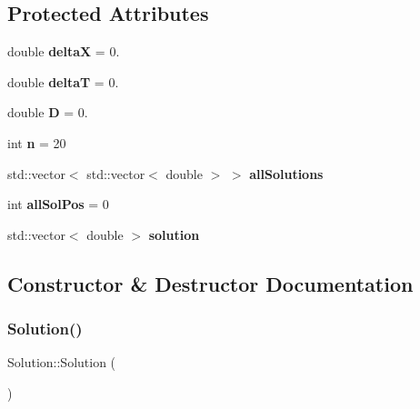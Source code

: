 \subsection*{Protected Attributes}
\begin{DoxyCompactItemize}
\item 
\mbox{\label{class_solution_a8e97e5534ddcde31983432b8fb2050ff}} 
double {\bfseries deltaX} = 0.
\item 
\mbox{\label{class_solution_a116a08a1a8793618fb5269016cfd9b61}} 
double {\bfseries deltaT} = 0.
\item 
\mbox{\label{class_solution_af647b9b893549259060034672babb0f8}} 
double {\bfseries D} = 0.
\item 
\mbox{\label{class_solution_aca95282163f453b465bb1991c596a34e}} 
int {\bfseries n} = 20
\item 
\mbox{\label{class_solution_a09fa8d2538a87e8d9cba2ee682f729ac}} 
std\+::vector$<$ std\+::vector$<$ double $>$ $>$ {\bfseries all\+Solutions}
\item 
\mbox{\label{class_solution_af933662f6d08824b37f315fc36678c3b}} 
int {\bfseries all\+Sol\+Pos} = 0
\item 
\mbox{\label{class_solution_ae15c62e099b4ad8a337b62fd05283cd8}} 
std\+::vector$<$ double $>$ {\bfseries solution}
\end{DoxyCompactItemize}


\subsection{Constructor \& Destructor Documentation}
\mbox{\label{class_solution_ab55bd4b023d596ce11aaf737b9a6123b}} 
\subsubsection{\texorpdfstring{Solution()}{Solution()}\hspace{0.1cm}{\footnotesize\ttfamily [1/2]}}
{\footnotesize\ttfamily Solution\+::\+Solution (\begin{DoxyParamCaption}{ }\end{DoxyParamCaption})}

